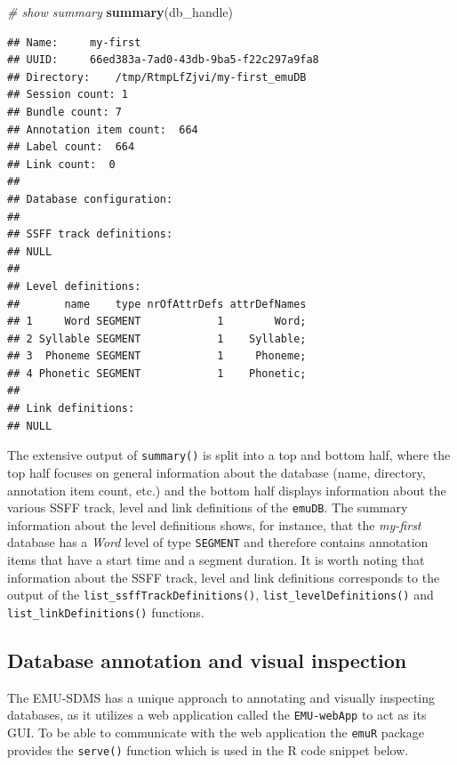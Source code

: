 \documentclass[]{book}
\newenvironment{Shaded}{\begin{snugshade}}{\end{snugshade}}
\newcommand{\CommentTok}[1]{\textcolor[rgb]{0.56,0.35,0.01}{\textit{#1}}}
\newcommand{\KeywordTok}[1]{\textcolor[rgb]{0.13,0.29,0.53}{\textbf{#1}}}
\newcommand{\NormalTok}[1]{#1}
\begin{document}
\begin{Shaded}
\begin{Highlighting}[]
\CommentTok{# show summary}
\KeywordTok{summary}\NormalTok{(db_handle)}
\end{Highlighting}
\end{Shaded}

\begin{verbatim}
## Name:     my-first 
## UUID:     66ed383a-7ad0-43db-9ba5-f22c297a9fa8 
## Directory:    /tmp/RtmpLfZjvi/my-first_emuDB 
## Session count: 1 
## Bundle count: 7 
## Annotation item count:  664 
## Label count:  664 
## Link count:  0 
## 
## Database configuration:
## 
## SSFF track definitions:
## NULL
## 
## Level definitions:
##       name    type nrOfAttrDefs attrDefNames
## 1     Word SEGMENT            1        Word;
## 2 Syllable SEGMENT            1    Syllable;
## 3  Phoneme SEGMENT            1     Phoneme;
## 4 Phonetic SEGMENT            1    Phonetic;
## 
## Link definitions:
## NULL
\end{verbatim}

The extensive output of \texttt{summary()} is split into a top and bottom half, where the top half focuses on general information about the database (name, directory, annotation item count, etc.) and the bottom half displays information about the various SSFF track, level and link definitions of the \texttt{emuDB}. The summary information about the level definitions shows, for instance, that the \emph{my-first} database has a \emph{Word} level of type \texttt{SEGMENT} and therefore contains annotation items that have a start time and a segment duration. It is worth noting that information about the SSFF track, level and link definitions corresponds to the output of the \texttt{list\_ssffTrackDefinitions()}, \texttt{list\_levelDefinitions()} and \texttt{list\_linkDefinitions()} functions.

\hypertarget{database-annotation-and-visual-inspection}{%
\subsection{Database annotation and visual inspection}\label{database-annotation-and-visual-inspection}}

The EMU-SDMS has a unique approach to annotating and visually inspecting databases, as it utilizes a web application called the \texttt{EMU-webApp} to act as its GUI. To be able to communicate with the web application the \texttt{emuR} package provides the \texttt{serve()} function which is used in the R code snippet below.
\end{document}

